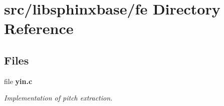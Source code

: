 \section{src/libsphinxbase/fe Directory Reference}
\label{dir_b1d999ee57d4a6d8d8bcab6209918fc2}
\subsection*{Files}
\begin{DoxyCompactItemize}
\item 
file \textbf{ yin.\+c}
\begin{DoxyCompactList}\small\item\em Implementation of pitch extraction. \end{DoxyCompactList}\end{DoxyCompactItemize}
